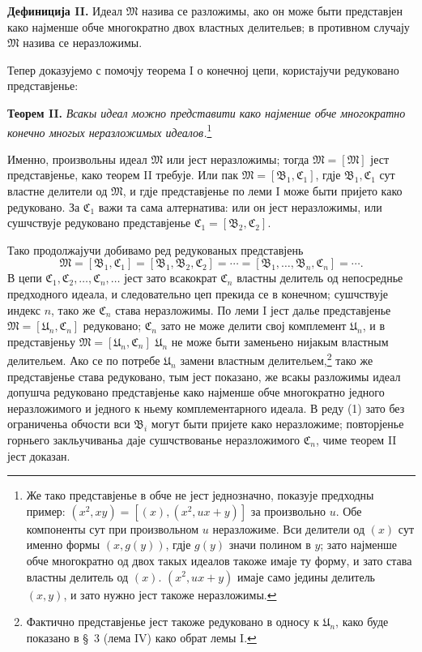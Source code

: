 ﻿\documentclass[11pt]{article}
\newcommand{\ideal}[1]{\mathfrak{#1}}
\begin{document}
\textbf{Дефиниција II.} Идеал \(\ideal M\) назива се разложимы, ако он може быти представјен како најменше обче многократно двох властных делительев; в противном случају \(\ideal M\) назива се неразложимы.

Тепер доказујемо с помочју теорема I о конечној цепи, користајучи редуковано представјенье:

\textbf{Теорем II.} \emph{Всакы идеал можно представити како најменше обче многократно конечно многых неразложимых идеалов.}\footnote{Же тако представјенье в обче не јест једнозначно, показује предходны пример: \((x^2,xy)=[(x),(x^2,ux+y)]\) за произвольно \(u\). Обе компоненты сут при произвольном \(u\) неразложиме. Вси делители од \((x)\) сут именно формы \((x,g(y))\), гдје \(g(y)\) значи полином в \(y\); зато најменше обче многократно од двох такых идеалов такоже имаје ту форму, и зато става властны делитель од \((x)\). \((x^2,ux+y)\) имаје само једины делитель \((x,y)\), и зато нужно јест такоже неразложимы.}

Именно, произвольны идеал \(\ideal M\) или јест неразложимы; тогда \(\ideal M=[\ideal M]\) јест представјенье, како теорем II требује. Или пак \(\ideal M=[\ideal B_1,\ideal C_1]\), гдје \(\ideal B_1,\ideal C_1\) сут властне делители од \(\ideal M\), и гдје представјенье по леми I може быти пријето како редуковано. За \(\ideal C_1\) важи та сама алтернатива: или он јест неразложимы, или сушчствује редуковано представјенье \(\ideal C_1=[\ideal B_2,\ideal C_2]\).

Тако продолжајучи добивамо ред редукованых представјень
\begin{equation}
 \ideal M=[\ideal B_1,\ideal C_1]=[\ideal B_1,\ideal B_2,\ideal C_2]=\cdots=[\ideal B_1,\ldots,\ideal B_n,\ideal C_n]=\cdots .
\tag{1}
\end{equation}
В цепи \(\ideal C_1,\ideal C_2,\ldots,\ideal C_n,\ldots\) јест зато всакократ \(\ideal C_n\) властны делитель од непосреднье предходного идеала, и следовательно цеп прекида се в конечном; сушчствује индекс \(n\), тако же \(\ideal C_n\) става неразложимы. По леми I јест далье представјенье \(\ideal M=[\ideal U_n,\ideal C_n]\) редуковано; \(\ideal C_n\) зато не може делити свој комплемент \(\ideal U_n\), и в представјеньу \(\ideal M=[\ideal U_n,\ideal C_n]\) \(\ideal U_n\) не може быти заменьено нијакым властным делительем. Ако се по потребе \(\ideal U_n\) замени властным делительем,\footnote{Фактично представјенье јест такоже редуковано в односу к \(\ideal U_n\), како буде показано в \S~3 (лема IV) како обрат лемы I.} тако же представјенье става редуковано, тым јест показано, же всакы разложимы идеал допушча редуковано представјенье како најменше обче многократно једного неразложимого и једного к ньему комплементарного идеала. В реду (1) зато без ограниченьа обчости вси \(\ideal B_i\) могут быти пријете како неразложиме; повторјенье горньего закльучиваньа даје сушчствованье неразложимого \(\ideal C_n\), чиме теорем II јест доказан.

\clearpage
\end{document}
